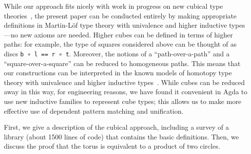 While our approach fits nicely with work in progress on new cubical type
theories~\citep{us,altenkirchkaposi14cubical,coquand14variations}, the
present paper can be conducted entirely by making appropriate
definitions in Martin-L\"of type theory with univalence and higher
inductive types---no new axioms are needed.  Higher cubes can be defined
in terms of higher paths: for example, the type of squares considered
above can be thought of as discs \verb|b ∘ l == r ∘ t|.  Moreover, the
notions of a ``path-over-a-path'' and a ``square-over-a-square'' can be
reduced to homogeneous paths.  This means that our constructions can be
interpreted in the known models of homotopy type theory with univalence
and higher inductive
types~\cite{voevodsky+12simpluniv,shulman13inversediag,lumsdaine+13hits}.
While cubes can be reduced away in this way, for engineering reasons, we
have found it convenient in Agda to use new inductive families to
represent cube types; this allows us to make more effective use of
dependent pattern matching and unification.    

First, we give a description of the cubical approach, including a survey
of a library (about 1500 lines of code) that contains the basic
definitions.  Then, we discuss the proof that the torus is equivalent to
a product of two circles.  





